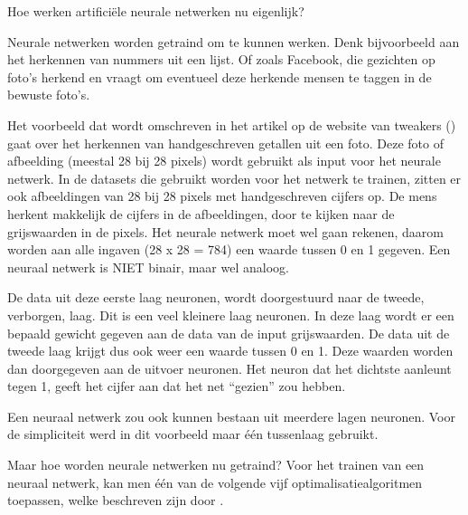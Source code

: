 Hoe werken artificiële neurale netwerken nu eigenlijk? 

Neurale netwerken worden getraind om te kunnen werken. Denk bijvoorbeeld aan het herkennen van nummers uit een lijst. Of zoals Facebook, die gezichten op foto’s herkend en vraagt om eventueel deze herkende mensen te taggen in de bewuste foto’s. 

Het voorbeeld dat wordt omschreven in het artikel op de website van tweakers (\textcite{tweakers}) gaat over het herkennen van handgeschreven getallen uit een foto. Deze foto of afbeelding (meestal 28 bij 28 pixels) wordt gebruikt als input voor het neurale netwerk. In de datasets die gebruikt worden voor het netwerk te trainen, zitten er ook afbeeldingen van 28 bij 28 pixels met handgeschreven cijfers op. De mens herkent makkelijk de cijfers in de afbeeldingen, door te kijken naar de grijswaarden in de pixels. Het neurale netwerk moet wel gaan rekenen, daarom worden aan alle ingaven (28 x 28 = 784) een waarde tussen 0 en 1 gegeven. Een neuraal netwerk is NIET binair, maar wel analoog. 

De data uit deze eerste laag neuronen, wordt doorgestuurd naar de tweede, verborgen, laag. Dit is een veel kleinere laag neuronen. In deze laag wordt er een bepaald gewicht gegeven aan de data van de input grijswaarden. De data uit de tweede laag krijgt dus ook weer een waarde tussen 0 en 1. Deze waarden worden dan doorgegeven aan de uitvoer neuronen. Het neuron dat het dichtste aanleunt tegen 1, geeft het cijfer aan dat het net “gezien” zou hebben. 

Een neuraal netwerk zou ook kunnen bestaan uit meerdere lagen neuronen. Voor de simpliciteit werd in dit voorbeeld maar één tussenlaag gebruikt.

Maar hoe worden neurale netwerken nu getraind? Voor het trainen van een neuraal netwerk, kan men één van de volgende vijf optimalisatiealgoritmen toepassen, welke beschreven zijn door \textcite{neuraldesigners}.

